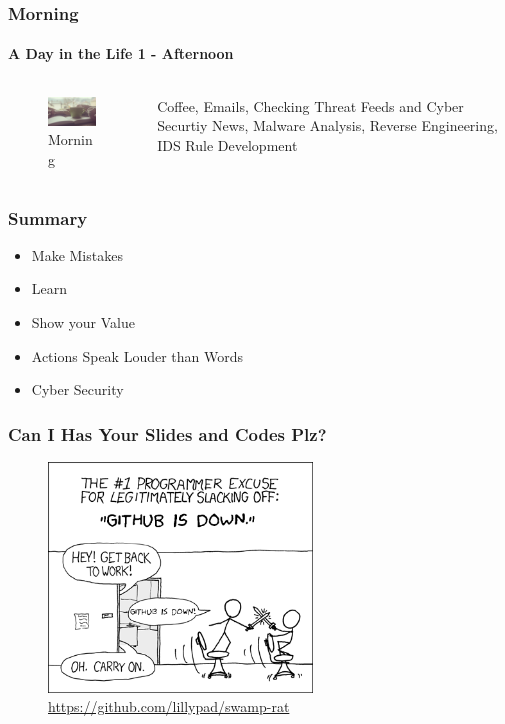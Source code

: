 \documentclass[aspectratio=169]{beamer}
\begin{document}
\begin{frame}
  \frametitle{Morning}
  \framesubtitle{A Day in the Life 1 - Afternoon}
  \begin{columns}[onlytextwidth]
    \begin{column}{.30\textwidth}
      \begin{figure}
        \includegraphics[width=5.5cm,keepaspectratio]{morning}
        \caption{Morning}
      \end{figure}
    \end{column}
    \hfill
    \begin{column}{.60\textwidth}
        \begin{tcolorbox}[title=social\_media.log,colback=gray]
          Coffee, Emails, Checking Threat Feeds and Cyber Securtiy News, Malware Analysis, Reverse Engineering, IDS Rule Development
        \end{tcolorbox}
    \end{column}
  \end{columns}
\end{frame}

\begin{frame}
  \frametitle{Summary}
  \begin{itemize}
  \item{Make Mistakes}
  \item{Learn}
  \item{Show your Value}
  \item{Actions Speak Louder than Words}
  \item{Cyber Security}
  \end{itemize}
\end{frame}

\begin{frame}
  \frametitle{Can I Has Your Slides and Codes Plz?}
  \begin{center}
    \begin{figure}
      \includegraphics[width=7cm,keepaspectratio]{git_meme}
      \caption{\href{https://github.com/lillypad/swamp-rat}{https://github.com/lillypad/swamp-rat}}
    \end{figure}
  \end{center}
\end{frame}
\end{document}
